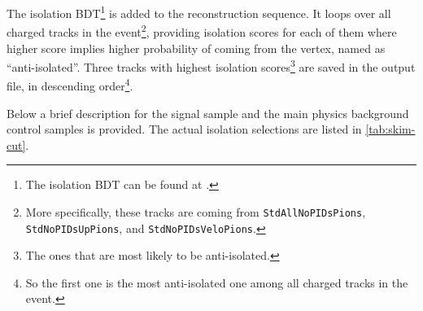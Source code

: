 The isolation BDT\footnote{
    The isolation BDT can be found at
    .
} is added to the \davinci reconstruction sequence.
It loops over all charged tracks in the event\footnote{
    More specifically, these tracks are coming from
    \texttt{StdAllNoPIDsPions}, \texttt{StdNoPIDsUpPions},
    and \texttt{StdNoPIDsVeloPions}.
},
providing isolation scores for each of them where
higher score implies higher probability of coming from the vertex, named as
``anti-isolated''.
Three tracks with highest isolation scores\footnote{
    The ones that are most likely to be anti-isolated.
} are saved in the output file, in descending order\footnote{
    So the first one is the most anti-isolated one among all charged tracks
    in the event.
}.

Below a brief description for the signal sample and the main physics background
control samples is provided.
The actual isolation selections are listed in \cref{tab:skim-cut}.

